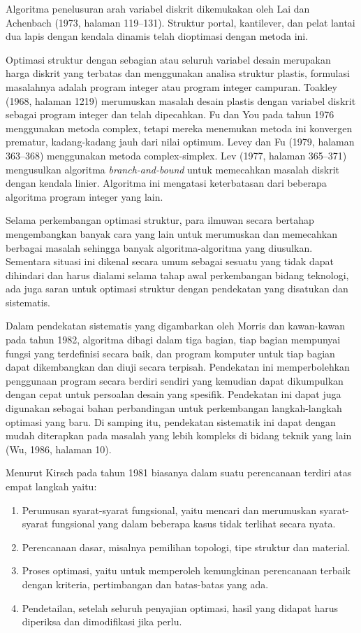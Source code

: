 Algoritma penelusuran arah variabel diskrit dikemukakan oleh Lai dan
Achenbach (1973, halaman 119--131). Struktur portal, kantilever, dan
pelat lantai dua lapis dengan kendala dinamis telah dioptimasi dengan
metoda ini.

Optimasi struktur dengan sebagian atau seluruh variabel desain merupakan
harga diskrit yang terbatas dan menggunakan analisa struktur plastis,
formulasi masalahnya adalah program integer atau program integer
campuran. Toakley (1968, halaman 1219) merumuskan masalah desain plastis
dengan variabel diskrit sebagai program integer dan telah dipecahkan. Fu
dan You pada tahun 1976 menggunakan metoda complex, tetapi mereka
menemukan metoda ini konvergen prematur, kadang-kadang jauh dari nilai
optimum. Levey dan Fu (1979, halaman 363--368) menggunakan metoda
complex-simplex. Lev (1977, halaman 365--371) mengusulkan algoritma
\textit{branch-and-bound} untuk memecahkan masalah diskrit dengan kendala
linier. Algoritma ini mengatasi keterbatasan dari beberapa algoritma
program integer yang lain.

Selama perkembangan optimasi struktur, para ilmuwan secara bertahap
mengembangkan banyak cara yang lain untuk merumuskan dan memecahkan
berbagai masalah sehingga banyak algoritma-algoritma yang diusulkan.
Sementara situasi ini dikenal secara umum sebagai sesuatu yang tidak dapat
dihindari dan harus dialami selama tahap awal perkembangan bidang
teknologi, ada juga saran untuk optimasi struktur dengan pendekatan yang
disatukan dan sistematis.

Dalam pendekatan sistematis yang digambarkan oleh Morris dan kawan-kawan
pada tahun 1982, algoritma dibagi dalam tiga bagian, tiap bagian mempunyai
fungsi yang terdefinisi secara baik, dan program komputer untuk tiap
bagian dapat dikembangkan dan diuji secara terpisah. Pendekatan ini
memperbolehkan penggunaan program secara berdiri sendiri yang kemudian
dapat dikumpulkan dengan cepat untuk persoalan desain yang spesifik.
Pendekatan ini dapat juga digunakan sebagai bahan perbandingan untuk
perkembangan langkah-langkah optimasi yang baru. Di samping itu,
pendekatan sistematik ini dapat dengan mudah diterapkan pada masalah yang
lebih kompleks di bidang teknik yang lain (Wu, 1986, halaman 10).

Menurut Kirsch pada tahun 1981 biasanya dalam suatu perencanaan terdiri
atas empat langkah yaitu:
\begin{enumerate}[label=\arabic*.]
\item Perumusan syarat-syarat fungsional, yaitu mencari dan merumuskan
      syarat-syarat fungsional yang dalam beberapa kasus tidak terlihat
      secara nyata.
\item Perencanaan dasar, misalnya pemilihan topologi, tipe struktur dan
      material.
\item Proses optimasi, yaitu untuk memperoleh kemungkinan perencanaan
      terbaik dengan kriteria, pertimbangan dan batas-batas yang ada.
\item Pendetailan, setelah seluruh penyajian optimasi, hasil yang didapat
      harus diperiksa dan dimodifikasi jika perlu.
\end{enumerate}


